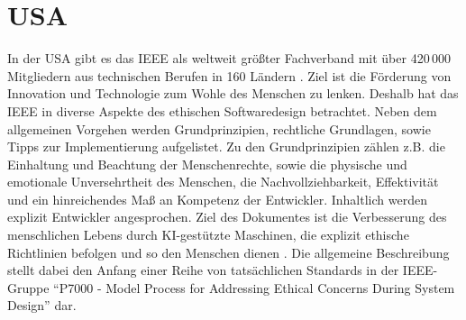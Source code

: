 \section{USA}\label{sec:usa}
In der USA gibt es das IEEE \cite{ieee} als weltweit größter Fachverband mit über 420\,000 Mitgliedern aus technischen Berufen in 160 Ländern \cite[S. 287]{chatila2019}.
Ziel ist die Förderung von Innovation und Technologie zum Wohle des Menschen zu lenken.
Deshalb hat das IEEE in  diverse Aspekte des ethischen Softwaredesign betrachtet.
\ab 
Neben dem allgemeinen Vorgehen werden Grundprinzipien, rechtliche Grundlagen, sowie Tipps zur Implementierung aufgelistet.
Zu den Grundprinzipien zählen z.B. die Einhaltung und Beachtung der Menschenrechte, sowie die physische und emotionale Unversehrtheit des Menschen, die Nachvollziehbarkeit, Effektivität und ein hinreichendes Maß an Kompetenz der Entwickler.
Inhaltlich werden explizit Entwickler angesprochen.
Ziel des Dokumentes ist die Verbesserung des menschlichen Lebens durch KI-gestützte Maschinen, die explizit ethische Richtlinien befolgen und so den Menschen dienen \cite[S. 6]{chatila2019}.
Die allgemeine Beschreibung stellt dabei den Anfang einer Reihe von tatsächlichen Standards in der IEEE-Gruppe \enquote{P7000 - Model Process for Addressing Ethical Concerns During System Design}\cite[S. 283]{chatila2019} \cite{emelc-wg} dar.